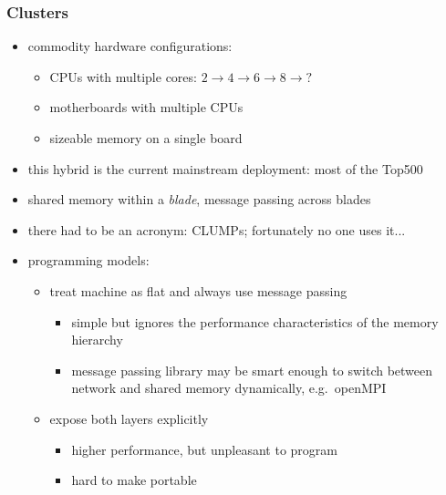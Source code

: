 \begin{frame}[fragile]
%
  \frametitle{Clusters}
%
  \begin{itemize}
%
  \item commodity hardware configurations:
    \begin{itemize}
      \item CPUs with multiple cores: $2 \rightarrow 4 \rightarrow 6 \rightarrow 8 \rightarrow
        ?$
      \item motherboards with multiple CPUs
      \item sizeable memory on a single board
    \end{itemize}
%
  \item this hybrid is the current mainstream deployment: most of the Top500
%
  \item shared memory within a {\em blade}, message passing across blades
%
  \item there had to be an acronym: CLUMPs; fortunately no one uses it...
%
  \item programming models:
    \begin{itemize}
      \item treat machine as flat and always use message passing
        \begin{itemize}
        \item simple but ignores the performance characteristics of the memory hierarchy
        \item message passing library may be smart enough to switch between network and shared
          memory dynamically, e.g.~openMPI
        \end{itemize}
      \item expose both layers explicitly
        \begin{itemize}
          \item higher performance, but unpleasant to program
          \item hard to make portable
        \end{itemize}
    \end{itemize}
%
  \end{itemize}
%
\end{frame}

